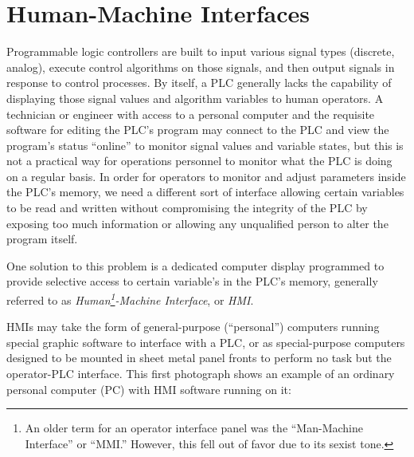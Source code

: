 











\filbreak
\section{Human-Machine Interfaces}

Programmable logic controllers are built to input various signal types (discrete, analog), execute control algorithms on those signals, and then output signals in response to control processes.  By itself, a PLC generally lacks the capability of displaying those signal values and algorithm variables to human operators.  A technician or engineer with access to a personal computer and the requisite software for editing the PLC's program may connect to the PLC and view the program's status ``online'' to monitor signal values and variable states, but this is not a practical way for operations personnel to monitor what the PLC is doing on a regular basis.  In order for operators to monitor and adjust parameters inside the PLC's memory, we need a different sort of interface allowing certain variables to be read and written without compromising the integrity of the PLC by exposing too much information or allowing any unqualified person to alter the program itself.

One solution to this problem is a dedicated computer display programmed to provide selective access to certain variable's in the PLC's memory, generally referred to as \textit{Human\footnote{An older term for an operator interface panel was the ``Man-Machine Interface'' or ``MMI.''  However, this fell out of favor due to its sexist tone.}-Machine Interface}, or \textit{HMI}.    

HMIs may take the form of general-purpose (``personal'') computers running special graphic software to interface with a PLC, or as special-purpose computers designed to be mounted in sheet metal panel fronts to perform no task but the operator-PLC interface.  This first photograph shows an example of an ordinary personal computer (PC) with HMI software running on it:

